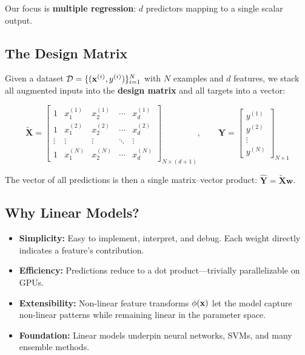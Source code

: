 Our focus is \textbf{multiple regression}: $d$ predictors mapping to a single scalar output.

\subsection*{The Design Matrix}

Given a dataset $\mathcal{D} = \{(\mathbf{x}^{(i)}, y^{(i)})\}_{i=1}^N$ with $N$ examples and $d$ features, we stack all augmented inputs into the \textbf{design matrix} and all targets into a vector:

$$
\tilde{\mathbf{X}} =
\begin{bmatrix}
1 & x_1^{(1)} & x_2^{(1)} & \cdots & x_d^{(1)} \\
1 & x_1^{(2)} & x_2^{(2)} & \cdots & x_d^{(2)} \\
\vdots & \vdots & \vdots & \ddots & \vdots \\
1 & x_1^{(N)} & x_2^{(N)} & \cdots & x_d^{(N)}
\end{bmatrix}_{N \times (d+1)},
\qquad
\mathbf{Y} =
\begin{bmatrix}
y^{(1)} \\ y^{(2)} \\ \vdots \\ y^{(N)}
\end{bmatrix}_{N \times 1}
$$

The vector of all predictions is then a single matrix--vector product: $\hat{\mathbf{Y}} = \tilde{\mathbf{X}} \mathbf{w}$.

\subsection*{Why Linear Models?}

\begin{itemize}
    \item \textbf{Simplicity:} Easy to implement, interpret, and debug. Each weight directly indicates a feature's contribution.
    \item \textbf{Efficiency:} Predictions reduce to a dot product---trivially parallelizable on GPUs.
    \item \textbf{Extensibility:} Non-linear feature transforms $\phi(\mathbf{x})$ let the model capture non-linear patterns while remaining linear in the parameter space.
    \item \textbf{Foundation:} Linear models underpin neural networks, SVMs, and many ensemble methods.
\end{itemize}

